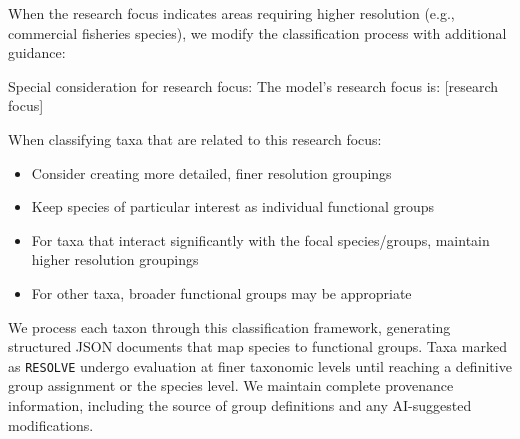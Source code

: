 When the research focus indicates areas requiring higher resolution (e.g., commercial fisheries species), we modify the classification process with additional guidance:

\begin{prompt}
Special consideration for research focus:
The model's research focus is: [research focus]

When classifying taxa that are related to this research focus:
\begin{itemize}
\item Consider creating more detailed, finer resolution groupings
\item Keep species of particular interest as individual functional groups
\item For taxa that interact significantly with the focal species/groups, maintain higher resolution groupings
\item For other taxa, broader functional groups may be appropriate
\end{itemize}
\end{prompt}

We process each taxon through this classification framework, generating structured JSON documents that map species to functional groups. Taxa marked as \texttt{RESOLVE} undergo evaluation at finer taxonomic levels until reaching a definitive group assignment or the species level. We maintain complete provenance information, including the source of group definitions and any AI-suggested modifications.
